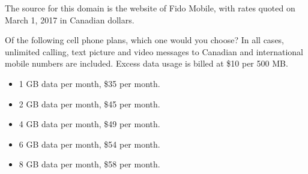 
The source for this domain is the website of Fido Mobile, with rates quoted on March 1, 2017 in Canadian dollars.

\begin{tcolorbox}
Of the following cell phone plans, which one would you choose? In all cases, unlimited calling, text picture and video messages to Canadian and international mobile numbers are included. Excess data usage is billed at \$10 per 500 MB.

\begin{itemize}
	\setlength\itemsep{-5pt}
	\item 1 GB data per month, \$35 per month.
	\item 2 GB data per month, \$45 per month.
	\item 4 GB data per month, \$49 per month.
	\item 6 GB data per month, \$54 per month.
	\item 8 GB data per month, \$58 per month.
\end{itemize}
\end{tcolorbox}

